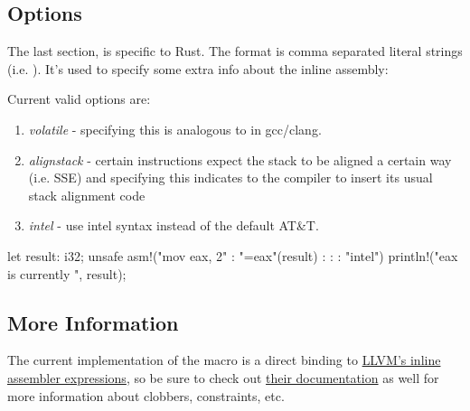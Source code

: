 \subsection*{Options}

The last section,  is specific to Rust. The format is comma separated literal strings (i.e. 
). It's used to specify some extra info about the inline assembly:

\blank

Current valid options are:

\begin{enumerate}
  \item{\emph{volatile} - specifying this is analogous to  in gcc/clang.}
  \item{\emph{alignstack} - certain instructions expect the stack to be aligned a certain way (i.e. SSE) and specifying this 
      indicates to the compiler to insert its usual stack alignment code}
  \item{\emph{intel} - use intel syntax instead of the default AT\&T.}
\end{enumerate}

\begin{rustc}
let result: i32;
unsafe {
   asm!("mov eax, 2" : "={eax}"(result) : : : "intel")
}
println!("eax is currently {}", result);
\end{rustc}

\subsection*{More Information}

The current implementation of the  macro is a direct binding to 
\href{http://llvm.org/docs/LangRef.html\#inline-assembler-expressions}{LLVM's inline assembler expressions}, so be sure to 
check out \href{http://llvm.org/docs/LangRef.html\#inline-assembler-expressions}{their documentation} as well for more information 
about clobbers, constraints, etc.
